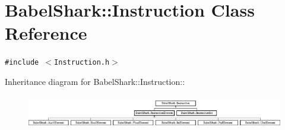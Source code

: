 \hypertarget{class_babel_shark_1_1_instruction}{
\section{BabelShark::Instruction Class Reference}
\label{class_babel_shark_1_1_instruction}
}
{\tt \#include $<$Instruction.h$>$}

Inheritance diagram for BabelShark::Instruction::\begin{figure}[H]
\begin{center}
\leavevmode
\includegraphics[height=1.45078cm]{class_babel_shark_1_1_instruction}
\end{center}
\end{figure}

